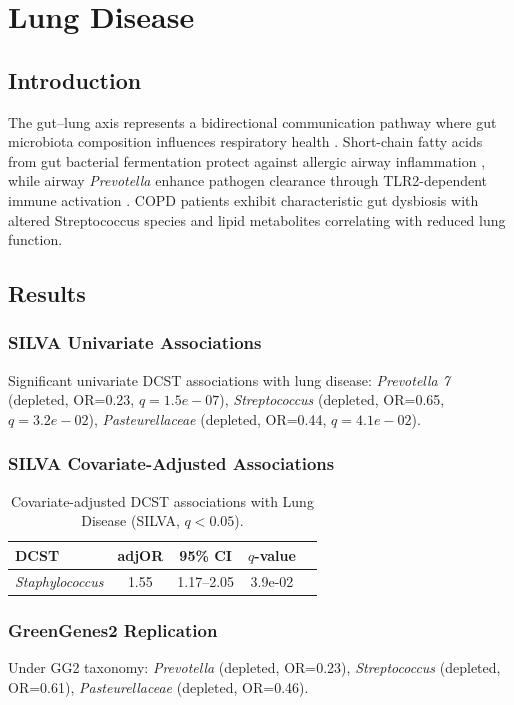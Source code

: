 \documentclass[11pt,a4paper]{article}
\begin{document}
\section{Lung Disease}
\subsection{Introduction}
The gut--lung axis represents a bidirectional communication pathway where gut microbiota composition influences respiratory health \cite{Budden2017_gutlung}. Short-chain fatty acids from gut bacterial fermentation protect against allergic airway inflammation \cite{Trompette2014_fiber_asthma}, while airway \textit{Prevotella} enhance pathogen clearance through TLR2-dependent immune activation \cite{Horn2022_Prevotella_lung}. COPD patients exhibit characteristic gut dysbiosis with altered Streptococcus species and lipid metabolites correlating with reduced lung function.

\subsection{Results}
\subsubsection{SILVA Univariate Associations}
Significant univariate DCST associations with lung disease: \textit{Prevotella 7} (depleted, OR=0.23, $q=1.5e-07$), \textit{Streptococcus} (depleted, OR=0.65, $q=3.2e-02$), \textit{Pasteurellaceae} (depleted, OR=0.44, $q=4.1e-02$).

\subsubsection{SILVA Covariate-Adjusted Associations}
\begin{table}[H]\centering\small
\caption{Covariate-adjusted DCST associations with Lung Disease (SILVA, $q<0.05$).}\label{tab:Lung_disease_adj}
\begin{tabular}{lcccc}
\toprule
DCST & adjOR & 95\% CI & $q$-value \\
\midrule
\textit{Staphylococcus} & 1.55 & 1.17--2.05 & 3.9e-02 \\
\bottomrule
\end{tabular}\end{table}

\subsubsection{GreenGenes2 Replication}
Under GG2 taxonomy: \textit{Prevotella} (depleted, OR=0.23), \textit{Streptococcus} (depleted, OR=0.61), \textit{Pasteurellaceae} (depleted, OR=0.46).
\end{document}
